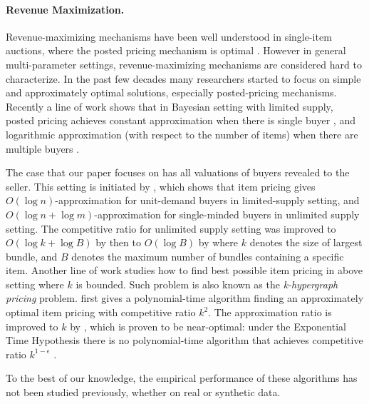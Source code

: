\paragraph{Revenue Maximization.}
Revenue-maximizing mechanisms have been well understood in single-item auctions, where the posted pricing
mechanism is optimal \cite{myerson1981optimal}. 
However in general multi-parameter settings, revenue-maximizing mechanisms are considered
hard to characterize. In the past few decades many researchers started to 
focus on simple and approximately optimal solutions, especially posted-pricing mechanisms.
Recently a line of work shows that in Bayesian setting with limited supply, posted pricing achieves 
constant approximation when there is single buyer 
\cite{babaioff2014simple, chawla2007algorithmic, 
chawla2010multi, chawla2015power, rubinstein2015simple},
and logarithmic approximation (with respect to the number of items) when there are multiple buyers 
\cite{cai2016duality, chawla2016mechanism, caizhao2017duality}.

The case that our paper focuses on has all valuations of buyers revealed to the seller. This setting
is initiated by \cite{guruswami2005profit}, which shows that item pricing 
gives $O(\log n)$-approximation for unit-demand buyers
in limited-supply setting, and $O(\log n+\log m)$-approximation for single-minded buyers in unlimited supply
setting. The competitive ratio for unlimited supply setting was improved to $O(\log k + \log B)$ 
by \cite{briest2006single} then to $O(\log B)$ by \cite{cheung2008approximation} where 
$k$ denotes the size of largest bundle, and $B$ denotes the maximum number of bundles containing a specific item.
Another line of work studies how to find best possible item pricing in above setting where $k$ is bounded. Such problem 
is also known as the \textit{k-hypergraph pricing} problem.
\cite{briest2006single} first gives a polynomial-time algorithm finding an approximately optimal item pricing
with competitive ratio $k^2$. The approximation ratio is improved to $k$ by \cite{balcan2006approximation},
which is proven to be near-optimal: under the Exponential Time Hypothesis there is no polynomial-time algorithm 
that achieves competitive ratio $k^{1-\epsilon}$ \cite{chalermsook2013independent}.

To the best of our knowledge, the empirical performance of these algorithms has not been studied previously, whether on real or synthetic data.

